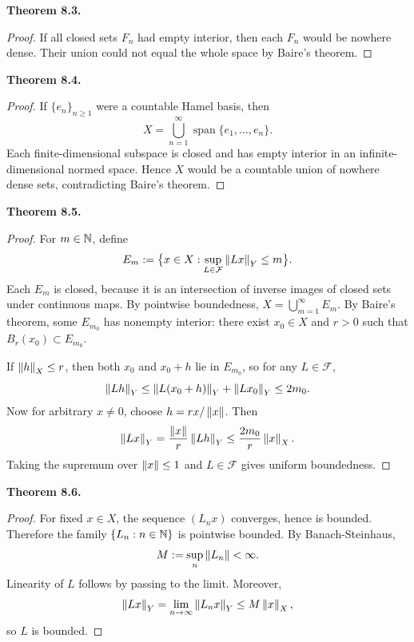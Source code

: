 \documentclass[11pt]{article}
\newenvironment{theoremstmt}[1]{%
  \par\medskip\noindent\textbf{Theorem #1. }\itshape
}{\par\medskip}
\begin{document}
\begin{theoremstmt}{8.3}
\thmBaireVariant
\end{theoremstmt}

\begin{proof}
If all closed sets $F_n$ had empty interior, then each $F_n$ would be nowhere dense. Their union could not equal the whole space by Baire's theorem.
\end{proof}

\begin{theoremstmt}{8.4}
\thmNoCountableHamelBasis
\end{theoremstmt}

\begin{proof}
If $\{e_n\}_{n\ge 1}$ were a countable Hamel basis, then
\[
X=\bigcup_{n=1}^{\infty}\operatorname{span}\{e_1,\dots,e_n\}.
\]
Each finite-dimensional subspace is closed and has empty interior in an infinite-dimensional normed space. Hence $X$ would be a countable union of nowhere dense sets, contradicting Baire's theorem.
\end{proof}

\begin{theoremstmt}{8.5}
\thmBanachSteinhaus
\end{theoremstmt}

\begin{proof}
For $m\in\mathbb{N}$, define
\[
E_m:=\bigl\{x\in X:\sup_{L\in\mathcal F}\left\lVert Lx\right\rVert_Y\le m\bigr\}.
\]
Each $E_m$ is closed, because it is an intersection of inverse images of closed sets under continuous maps. By pointwise boundedness, $X=\bigcup_{m=1}^{\infty}E_m$. By Baire's theorem, some $E_{m_0}$ has nonempty interior: there exist $x_0\in X$ and $r>0$ such that $B_r(x_0)\subset E_{m_0}$.

If $\left\lVert h\right\rVert_X\le r$, then both $x_0$ and $x_0+h$ lie in $E_{m_0}$, so for any $L\in\mathcal F$,
\[
\left\lVert Lh\right\rVert_Y\le \left\lVert L(x_0+h)\right\rVert_Y+\left\lVert Lx_0\right\rVert_Y\le 2m_0.
\]
Now for arbitrary $x\neq 0$, choose $h=rx/\left\lVert x\right\rVert$. Then
\[
\left\lVert Lx\right\rVert_Y=\frac{\left\lVert x\right\rVert}{r}\left\lVert Lh\right\rVert_Y\le \frac{2m_0}{r}\left\lVert x\right\rVert_X.
\]
Taking the supremum over $\left\lVert x\right\rVert\le 1$ and $L\in\mathcal F$ gives uniform boundedness.
\end{proof}

\begin{theoremstmt}{8.6}
\thmLimitOperatorBounded
\end{theoremstmt}

\begin{proof}
For fixed $x\in X$, the sequence $(L_nx)$ converges, hence is bounded. Therefore the family $\{L_n:n\in\mathbb{N}\}$ is pointwise bounded. By Banach-Steinhaus,
\[
M:=\sup_n\left\lVert L_n\right\rVert<\infty.
\]
Linearity of $L$ follows by passing to the limit. Moreover,
\[
\left\lVert Lx\right\rVert_Y=\lim_{n\to\infty}\left\lVert L_nx\right\rVert_Y\le M\left\lVert x\right\rVert_X,
\]
so $L$ is bounded.
\end{proof}
\end{document}
